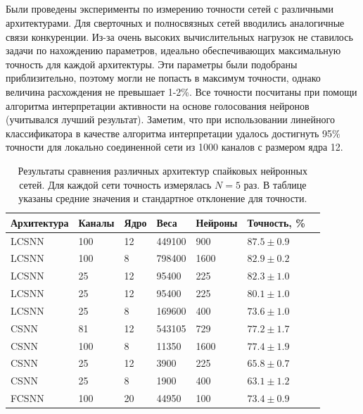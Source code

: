 \documentclass[a4paper]{article}
\begin{document}
\subsection{}
Были проведены эксперименты по измерению точности сетей с различными архитектурами. Для сверточных и полносвязных сетей вводились аналогичные связи конкуренции. Из-за очень высоких вычислительных нагрузок не ставилось задачи по нахождению параметров, идеально обеспечивающих максимальную точность для каждой архитектуры. Эти параметры были подобраны приблизительно, поэтому могли не попасть в максимум точности, однако величина расхождения не превышает 1-2\%. Все точности посчитаны при помощи алгоритма интерпретации активности на основе голосования нейронов (учитывался лучший результат). Заметим, что при использовании линейного классификатора в качестве алгоритма интерпретации удалось достигнуть 95\% точности для локально соединенной сети из 1000 каналов с размером ядра 12.

\begin{table}[H]
 \caption{Результаты сравнения различных архитектур спайковых нейронных сетей. Для каждой сети точность измерялась $N=5$ раз. В таблице указаны средние значения и стандартное отклонение для точности.}
\begin{center}
\begin{tabular}{|l|l|l|l|l|l|l|}
\hline
Архитектура & Каналы & Ядро & Веса & Нейроны & Точность, \% \\
\hline
{LCSNN} & {100} & {12} & {449100} & {900} & {$87.5 \pm 0.9$}\\
\hline
{LCSNN} & {100} & {8} & {798400} & {1600} & {$82.9 \pm 0.2$}\\
\hline
{LCSNN\footnotemark} & {25} & {12} & {95400} & {225} & {$82.3 \pm 1.0$}\\
\hline
{LCSNN} & {25} & {12} & {95400} & {225} & {$80.1 \pm 1.0$}\\
\hline
{LCSNN} & {25} & {8} & {169600} & {400} & {$73.6 \pm 1.0$}\\
\hline
{CSNN} & {81} & {12} & {543105} & {729} & {$77.2 \pm 1.7$}\\
\hline
{CSNN} & {100} & {8} & {11350} & {1600} & {$77.4 \pm 1.9$}\\
\hline
{CSNN} & {25} & {12} & {3900} & {225} & {$65.8 \pm 0.7$}\\
\hline
{CSNN} & {25} & {8} & {1900} & {400} & {$63.1 \pm 1.2$}\\
\hline
{FCSNN} & {100} & {20} & {44950} & {100} & {$73.4 \pm 0.9$}\\
\hline
\end{tabular}
\end{center}
\end{table}
\end{document}
